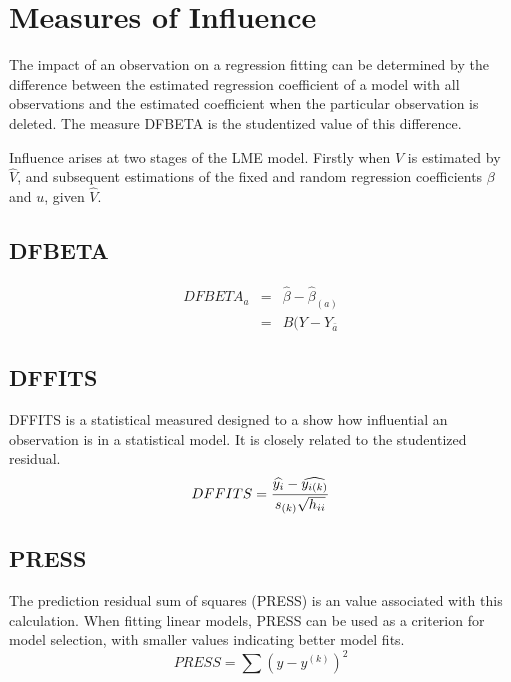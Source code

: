 \documentclass[Main.tex]{subfiles}
\begin{document}
\section{Measures of Influence} %

The impact of an observation on a regression fitting can be determined by the difference between the estimated regression coefficient of a model with all observations and the estimated coefficient when the particular observation is deleted. The measure DFBETA is the studentized value of this difference.

Influence arises at two stages of the LME model. Firstly when $V$ is estimated by $\hat{V}$, and subsequent
estimations of the fixed and random regression coefficients $\beta$ and $u$, given $\hat{V}$.


\subsection{DFBETA} %
\begin{eqnarray}
	DFBETA_{a} &=& \hat{\beta} - \hat{\beta}_{(a)} \\
	&=& B(Y-Y_{\bar{a}}
\end{eqnarray}

\subsection{DFFITS} %
DFFITS is a statistical measured designed to a show how influential an observation is in a statistical model. It is closely related to the studentized residual.
\begin{displaymath} DFFITS = {\widehat{y_i} -
		\widehat{y_{i(k)}} \over s_{(k)} \sqrt{h_{ii}}} \end{displaymath}



\subsection{PRESS} %
The prediction residual sum of squares (PRESS) is an value associated with this calculation. When fitting linear models, PRESS can be used as a criterion for model selection, with smaller values indicating better model fits.
\begin{equation}
	PRESS = \sum(y-y^{(k)})^2
\end{equation}
\end{document}
